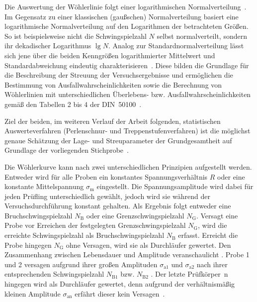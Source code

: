 Die Auswertung der Wöhlerlinie folgt einer logarithmischen Normalverteilung~\cite[Seite~19]{DIN50100}. 
Im Gegensatz zu einer klassischen (gaußschen) Normalverteilung basiert eine logarithmische Normalverteilung auf den Logarithmen der betrachteten Größen. So ist beispielsweise nicht die Schwingspielzahl $N$ selbst normalverteilt, sondern ihr dekadischer Logarithmus $\lg N$. 
Analog zur Standardnormalverteilung lässt sich jene über die beiden Kenngrößen logarithmierter Mittelwert und Standardabweichung eindeutig charakterisieren~\cite[Seite~50]{StatistikBetriebsfestigkeit}. 
Diese bilden die Grundlage für die Beschreibung der Streuung der Versuchsergebnisse und ermöglichen die Bestimmung von Ausfallwahrscheinlichkeiten sowie die Berechnung von Wöhlerlinien mit unterschiedlichen Überlebens- bzw. Ausfallwahrscheinlichkeiten gemäß den Tabellen 2 bis 4 der DIN~50100~\cite[Seite~28--35]{DIN50100}. 

Ziel der beiden, im weiteren Verlauf der Arbeit folgenden, statistischen Auswerteverfahren (Perlenschnur- und Treppenstufenverfahren) ist die möglichst genaue Schätzung der Lage- und Streuparameter der Grundgesamtheit auf Grundlage der vorliegenden Stichprobe~\cite[Seite~18]{DIN50100}.
	 
Die Wöhlerkurve kann nach zwei unterschiedlichen Prinzipien aufgestellt werden. Entweder wird für alle Proben ein konstantes Spannungsverhältnis $R$ oder eine konstante Mittelspannung $\sigma_{\text{m}}$ eingestellt. Die Spannungsamplitude wird dabei für jeden Prüfling unterschiedlich gewählt, jedoch wird sie während der Versuchsdurchführung konstant gehalten. Als Ergebnis folgt entweder eine Bruchschwingspielzahl $N_{\text{B}}$ oder eine Grenzschwingspielzahl $N_{\text{G}}$. Versagt eine Probe vor Erreichen der festgelegten Grenzschwingspielzahl $N_{\text{G}}$, wird die erreichte Schwingspielzahl als Bruchschwingspielzahl $N_{\text{B}}$ erfasst. Erreicht die Probe hingegen $N_{\text{G}}$ ohne Versagen, wird sie als Durchläufer gewertet. Den Zusammenhang zwischen Lebensdauer und Amplitude veranschaulicht . Probe 1 und 2 versagen aufgrund ihrer großen Amplituden $\sigma_{\text{a1}}$ und $\sigma_{\text{a2}}$ nach ihrer entsprechenden Schwingspielzahl $N_{\text{B1}}$ bzw. $N_{\text{B2}}$ . Der letzte Prüfkörper~n hingegen wird als Durchläufer gewertet, denn aufgrund der verhältnismäßig kleinen Amplitude $\sigma_{\text{an}}$ erfährt dieser kein Versagen~\cite[Seite~272]{Werkstofftechnik-Praktikum2021}. 

